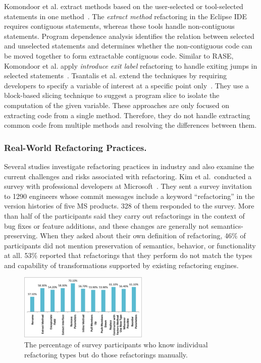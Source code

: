 Komondoor et al.\/ extract methods based on the user-selected or tool-selected statements in one method~\cite{Komondoor2000, Komondoor2003}. The {\em extract method} refactoring in the Eclipse IDE requires contiguous statements, whereas these tools handle non-contiguous statements. Program dependence analysis identifies the relation between selected and unselected statements and determines whether the non-contiguous code can be moved together to form extractable contiguous code. Similar to RASE, Komondoor et al.\/ apply {\em introduce exit label} refactoring to handle exiting jumps in selected statements~\cite{Komondoor2003}. Tsantalis et al.\/ extend the techniques by requiring developers to specify a variable of interest at a specific point only~\cite{tsantalis2011identification}. They use a block-based slicing technique to suggest a program slice to isolate the computation of the given variable. These approaches are only focused on extracting code from a single method. Therefore, they do not handle extracting common code from multiple methods and resolving the differences between them. 

\subsubsection{Real-World Refactoring Practices.} 
\label{sec:refactoringpractice} 

Several studies investigate refactoring practices in industry and also examine the current challenges and risks associated with refactoring. Kim et al.~conducted a survey with professional developers at Microsoft~\cite{Kim2012:FSR, Kim2014:EmpiricalStudy}. They sent a survey invitation to 1290 engineers whose commit messages include a keyword ``refactoring'' in the version histories of five MS products. 328 of them responded to the survey. More than half of the participants said they carry out refactorings in the context of bug fixes or feature additions, and these changes are generally not semantics-preserving. When they asked about their own definition of refactoring, 46\% of participants did not mention preservation of semantics, behavior, or functionality at all. 53\% reported that refactorings that they perform do not match the types and capability of transformations supported by existing refactoring engines. 

\begin{figure}[!htb]
\centering
    \includegraphics[width=0.55\textwidth]{images/manualRefactoring.pdf}
    \caption{The percentage of survey participants who know individual refactoring types but do those refactorings manually.\cite{Kim2014:EmpiricalStudy}}  
\label{fig:manualRefactoring} 
\end{figure} 

